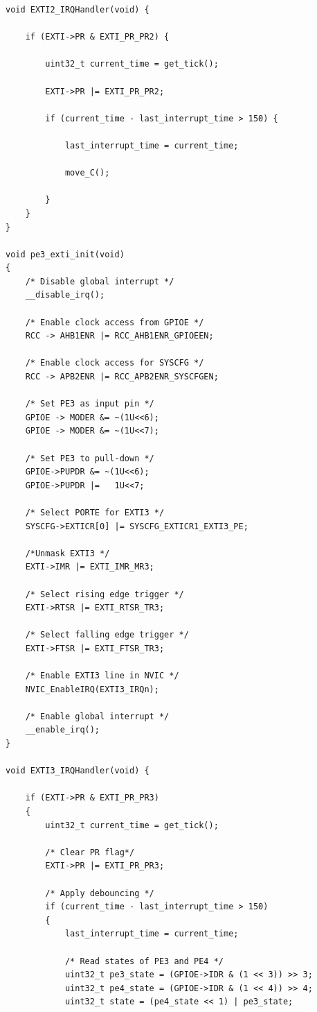 \documentclass[12pt]{article}
\numberwithin{subsubsubsection}{subsubsection}
\begin{document}
\begin{verbatim}
void EXTI2_IRQHandler(void) {

    if (EXTI->PR & EXTI_PR_PR2) {
    
        uint32_t current_time = get_tick();
    
        EXTI->PR |= EXTI_PR_PR2;
    
        if (current_time - last_interrupt_time > 150) {
    
            last_interrupt_time = current_time;
    
            move_C();
    
        }
    }
}

void pe3_exti_init(void) 
{
    /* Disable global interrupt */
    __disable_irq();
    
    /* Enable clock access from GPIOE */
    RCC -> AHB1ENR |= RCC_AHB1ENR_GPIOEEN;
    
    /* Enable clock access for SYSCFG */
    RCC -> APB2ENR |= RCC_APB2ENR_SYSCFGEN;
    
    /* Set PE3 as input pin */
    GPIOE -> MODER &= ~(1U<<6);
    GPIOE -> MODER &= ~(1U<<7);
    
    /* Set PE3 to pull-down */
    GPIOE->PUPDR &= ~(1U<<6);
    GPIOE->PUPDR |=   1U<<7;
    
    /* Select PORTE for EXTI3 */
    SYSCFG->EXTICR[0] |= SYSCFG_EXTICR1_EXTI3_PE;
    
    /*Unmask EXTI3 */
    EXTI->IMR |= EXTI_IMR_MR3;
    
    /* Select rising edge trigger */
    EXTI->RTSR |= EXTI_RTSR_TR3;
    
    /* Select falling edge trigger */
    EXTI->FTSR |= EXTI_FTSR_TR3;
    
    /* Enable EXTI3 line in NVIC */
    NVIC_EnableIRQ(EXTI3_IRQn);
    
    /* Enable global interrupt */
    __enable_irq();
}

void EXTI3_IRQHandler(void) {

    if (EXTI->PR & EXTI_PR_PR3)
    {
        uint32_t current_time = get_tick();
    
        /* Clear PR flag*/
        EXTI->PR |= EXTI_PR_PR3;
    
        /* Apply debouncing */
        if (current_time - last_interrupt_time > 150)
        {
            last_interrupt_time = current_time;
    
            /* Read states of PE3 and PE4 */
            uint32_t pe3_state = (GPIOE->IDR & (1 << 3)) >> 3;
            uint32_t pe4_state = (GPIOE->IDR & (1 << 4)) >> 4;
            uint32_t state = (pe4_state << 1) | pe3_state;
    

\end{verbatim}
\end{document}
